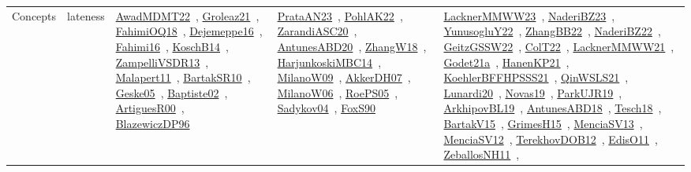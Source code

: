 {\begin{longtable}{lp{3cm}>{\raggedright\arraybackslash}p{6cm}>{\raggedright\arraybackslash}p{6cm}>{\raggedright\arraybackslash}p{8cm}}
\index{lateness}\index{Concepts!lateness}Concepts & lateness & \href{../works/AwadMDMT22.pdf}{AwadMDMT22}~\cite{AwadMDMT22}, \href{../works/Groleaz21.pdf}{Groleaz21}~\cite{Groleaz21}, \href{../works/FahimiOQ18.pdf}{FahimiOQ18}~\cite{FahimiOQ18}, \href{../works/Dejemeppe16.pdf}{Dejemeppe16}~\cite{Dejemeppe16}, \href{../works/Fahimi16.pdf}{Fahimi16}~\cite{Fahimi16}, \href{../works/KoschB14.pdf}{KoschB14}~\cite{KoschB14}, \href{../works/ZampelliVSDR13.pdf}{ZampelliVSDR13}~\cite{ZampelliVSDR13}, \href{../works/Malapert11.pdf}{Malapert11}~\cite{Malapert11}, \href{../works/BartakSR10.pdf}{BartakSR10}~\cite{BartakSR10}, \href{../works/Geske05.pdf}{Geske05}~\cite{Geske05}, \href{../works/Baptiste02.pdf}{Baptiste02}~\cite{Baptiste02}, \href{../works/ArtiguesR00.pdf}{ArtiguesR00}~\cite{ArtiguesR00}, \href{../works/BlazewiczDP96.pdf}{BlazewiczDP96}~\cite{BlazewiczDP96} & \href{../works/PrataAN23.pdf}{PrataAN23}~\cite{PrataAN23}, \href{../works/PohlAK22.pdf}{PohlAK22}~\cite{PohlAK22}, \href{../works/ZarandiASC20.pdf}{ZarandiASC20}~\cite{ZarandiASC20}, \href{../works/AntunesABD20.pdf}{AntunesABD20}~\cite{AntunesABD20}, \href{../works/ZhangW18.pdf}{ZhangW18}~\cite{ZhangW18}, \href{../works/HarjunkoskiMBC14.pdf}{HarjunkoskiMBC14}~\cite{HarjunkoskiMBC14}, \href{../works/MilanoW09.pdf}{MilanoW09}~\cite{MilanoW09}, \href{../works/AkkerDH07.pdf}{AkkerDH07}~\cite{AkkerDH07}, \href{../works/MilanoW06.pdf}{MilanoW06}~\cite{MilanoW06}, \href{../works/RoePS05.pdf}{RoePS05}~\cite{RoePS05}, \href{../works/Sadykov04.pdf}{Sadykov04}~\cite{Sadykov04}, \href{../works/FoxS90.pdf}{FoxS90}~\cite{FoxS90} & \href{../works/LacknerMMWW23.pdf}{LacknerMMWW23}~\cite{LacknerMMWW23}, \href{../works/NaderiBZ23.pdf}{NaderiBZ23}~\cite{NaderiBZ23}, \href{../works/YunusogluY22.pdf}{YunusogluY22}~\cite{YunusogluY22}, \href{../works/ZhangBB22.pdf}{ZhangBB22}~\cite{ZhangBB22}, \href{../works/NaderiBZ22.pdf}{NaderiBZ22}~\cite{NaderiBZ22}, \href{../works/GeitzGSSW22.pdf}{GeitzGSSW22}~\cite{GeitzGSSW22}, \href{../works/ColT22.pdf}{ColT22}~\cite{ColT22}, \href{../works/LacknerMMWW21.pdf}{LacknerMMWW21}~\cite{LacknerMMWW21}, \href{../works/Godet21a.pdf}{Godet21a}~\cite{Godet21a}, \href{../works/HanenKP21.pdf}{HanenKP21}~\cite{HanenKP21}, \href{../works/KoehlerBFFHPSSS21.pdf}{KoehlerBFFHPSSS21}~\cite{KoehlerBFFHPSSS21}, \href{../works/QinWSLS21.pdf}{QinWSLS21}~\cite{QinWSLS21}, \href{../works/Lunardi20.pdf}{Lunardi20}~\cite{Lunardi20}, \href{../works/Novas19.pdf}{Novas19}~\cite{Novas19}, \href{../works/ParkUJR19.pdf}{ParkUJR19}~\cite{ParkUJR19}, \href{../works/ArkhipovBL19.pdf}{ArkhipovBL19}~\cite{ArkhipovBL19}, \href{../works/AntunesABD18.pdf}{AntunesABD18}~\cite{AntunesABD18}, \href{../works/Tesch18.pdf}{Tesch18}~\cite{Tesch18}, \href{../works/BartakV15.pdf}{BartakV15}~\cite{BartakV15}, \href{../works/GrimesH15.pdf}{GrimesH15}~\cite{GrimesH15}, \href{../works/MenciaSV13.pdf}{MenciaSV13}~\cite{MenciaSV13}, \href{../works/MenciaSV12.pdf}{MenciaSV12}~\cite{MenciaSV12}, \href{../works/TerekhovDOB12.pdf}{TerekhovDOB12}~\cite{TerekhovDOB12}, \href{../works/EdisO11.pdf}{EdisO11}~\cite{EdisO11}, \href{../works/ZeballosNH11.pdf}{ZeballosNH11}~\cite{ZeballosNH11}, 
\end{longtable}}
